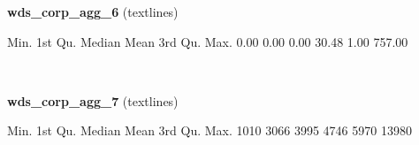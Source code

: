 \documentclass[]{article}
\newenvironment{Shaded}{\begin{snugshade}}{\end{snugshade}}
\newcommand{\DecValTok}[1]{\textcolor[rgb]{0.00,0.00,0.81}{{#1}}}
\newcommand{\FloatTok}[1]{\textcolor[rgb]{0.00,0.00,0.81}{{#1}}}
\newcommand{\NormalTok}[1]{{#1}}
\begin{document}
\textbf{wds\_corp\_agg\_6} (textlines)

\begin{Shaded}
\begin{Highlighting}[]
   \NormalTok{Min. 1st Qu.  Median    Mean 3rd Qu.    Max. }
   \FloatTok{0.00}    \FloatTok{0.00}    \FloatTok{0.00}   \FloatTok{30.48}    \FloatTok{1.00}  \FloatTok{757.00} 
\end{Highlighting}
\end{Shaded}

~

\vspace{1em}

\textbf{wds\_corp\_agg\_7} (textlines)

\begin{Shaded}
\begin{Highlighting}[]
   \NormalTok{Min. 1st Qu.  Median    Mean 3rd Qu.    Max. }
   \DecValTok{1010}    \DecValTok{3066}    \DecValTok{3995}    \DecValTok{4746}    \DecValTok{5970}   \DecValTok{13980} 
\end{Highlighting}
\end{Shaded}

~

\vspace{1em}
\end{document}
